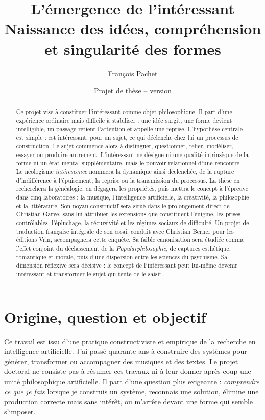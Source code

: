 \documentclass[11pt,a4paper]{article}
\title{L'émergence de l'intéressant\\
\large Naissance des idées, compréhension et singularité des formes}
\author{François Pachet}
\date{Projet de thèse -- version \projectversion\\\small \projectdate}
\begin{document}
\maketitle

\begin{abstract}
Ce projet vise à constituer l'intéressant comme objet philosophique. Il part
d'une expérience ordinaire mais difficile à stabiliser : une idée surgit, une
forme devient intelligible, un passage retient l'attention et appelle une
reprise. L'hypothèse centrale est simple : est intéressant, pour un sujet, ce
qui déclenche chez lui un processus de construction. Le sujet commence alors à
distinguer, questionner, relier, modéliser, essayer ou produire autrement.
L'intéressant ne désigne ni une qualité intrinsèque de la forme ni un état
mental supplémentaire, mais le pouvoir relationnel d'une rencontre. Le
néologisme \emph{intérescence} nommera la dynamique ainsi déclenchée, de la
rupture d'indifférence à l'épuisement, la reprise ou la transmission du
processus. La thèse en
recherchera la généalogie, en dégagera les propriétés,
puis mettra le concept à l'épreuve dans cinq laboratoires : la musique,
l'intelligence artificielle, la créativité, la philosophie et la littérature.
Son noyau constructif sera situé dans le prolongement direct de Christian
Garve, sans lui attribuer les extensions que constituent l'énigme, les prises
contrôlables, l'épluchage, la récursivité et les régimes sociaux de difficulté.
Un projet de traduction française intégrale de son essai, conduit avec
Christian Berner pour les éditions Vrin, accompagnera cette enquête.
Sa faible canonisation sera étudiée comme l'effet conjoint du déclassement de la
\emph{Popularphilosophie}, de captures esthétique, romantique et morale, puis
d'une dispersion entre les sciences du psychisme.
Sa dimension réflexive sera décisive : le concept de l'intéressant peut
lui-même devenir intéressant et transformer le sujet qui tente de le saisir.
\end{abstract}

\section{Origine, question et objectif}

Ce travail est issu d'une pratique constructiviste et empirique de la recherche
en intelligence artificielle. J'ai passé quarante ans à construire des systèmes
pour générer, transformer ou accompagner des musiques et des textes. Le projet
doctoral ne consiste pas à résumer ces travaux ni à leur donner après coup une
unité philosophique artificielle. Il part d'une question plus exigeante :
\emph{comprendre ce que je fais} lorsque je construis un système, reconnais une
solution, élimine une production correcte mais sans intérêt, ou m'arrête devant
une forme qui semble s'imposer.
\end{document}

